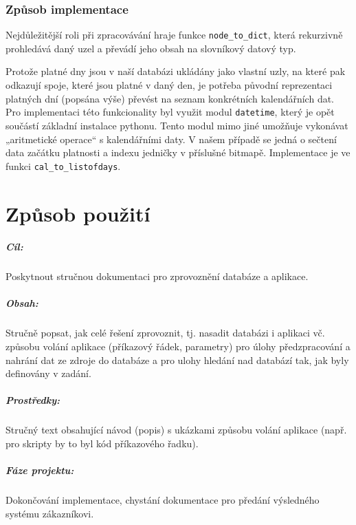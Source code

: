 \documentclass[10pt,xcolor=pdflatex,dvipsnames,table,oneside]{book}
\begin{document}
\subsection{Způsob implementace}
Nejdůležitější roli při zpracovávání hraje funkce \verb|node_to_dict|, která rekurzivně prohledává daný uzel a převádí jeho obsah na slovníkový datový typ.

Protože platné dny jsou v naší databázi ukládány jako vlastní uzly, na které pak odkazují spoje, které jsou platné v daný den, je potřeba původní reprezentaci platných dní (popsána výše) převést na seznam konkrétních kalendářních dat. Pro implementaci této funkcionality byl využit modul \verb|datetime|, který je opět součástí základní instalace pythonu. Tento modul mimo jiné umožňuje vykonávat „aritmetické operace“ s kalendářními daty. V našem případě se jedná o sečtení data začátku platnosti a indexu jedničky v příslušné bitmapě. Implementace je ve funkci \verb|cal_to_listofdays|.

\chapter{Způsob použití}

\paragraph{Cíl:}
Poskytnout stručnou dokumentaci pro zprovoznění databáze a aplikace.

\paragraph{Obsah:}
Stručně popsat, jak celé řešení zprovoznit, tj. nasadit databázi i aplikaci vč. způsobu volání aplikace (příkazový řádek, parametry) pro úlohy
předzpracování a nahrání dat ze zdroje do databáze a pro ulohy hledání nad databází tak, jak byly definovány v zadání.

\paragraph{Prostředky:}
Stručný text obsahující návod (popis) s ukázkami způsobu volání aplikace (např. pro skripty by to byl kód příkazového řadku).

\paragraph{Fáze projektu:}
Dokončování implementace, chystání dokumentace pro předání výsledného systému zákazníkovi.
\end{document}

